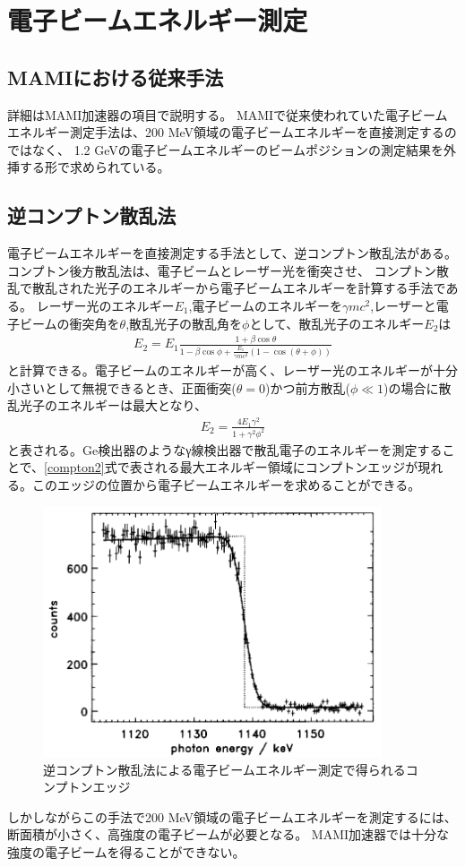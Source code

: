 \documentclass[a4paper,11pt,uplatex]{jsbook}
\begin{document}
\section{電子ビームエネルギー測定}
\subsection{MAMIにおける従来手法}
詳細はMAMI加速器の項目で説明する。%
MAMIで従来使われていた電子ビームエネルギー測定手法は、200 MeV領域の電子ビームエネルギーを直接測定するのではなく、
1.2 GeVの電子ビームエネルギーのビームポジションの測定結果を外挿する形で求められている。
\subsection{逆コンプトン散乱法}
電子ビームエネルギーを直接測定する手法として、逆コンプトン散乱法がある。コンプトン後方散乱法は、電子ビームとレーザー光を衝突させ、
コンプトン散乱で散乱された光子のエネルギーから電子ビームエネルギーを計算する手法である。
レーザー光のエネルギー$E_1$,電子ビームのエネルギーを$\gamma mc^2$,レーザーと電子ビームの衝突角を$\theta$,散乱光子の散乱角を$\phi$として、散乱光子のエネルギー$E_2$は
\begin{eqnarray}
  E_2 = E_1\frac{1+\beta\cos{\theta}}{1-\beta\cos{\phi} + \frac{E_1}{\gamma mc^2} (1-\cos{(\theta +\phi)})} \label{compton}
\end{eqnarray}
と計算できる。電子ビームのエネルギーが高く、レーザー光のエネルギーが十分小さいとして無視できるとき、正面衝突($\theta = 0$)かつ前方散乱($\phi \ll 1$)の場合に散乱光子のエネルギーは最大となり、
\begin{eqnarray}
  E_2 = \frac{4E_1\gamma^2}{1 + \gamma^2\phi^2} \label{compton2}
\end{eqnarray}
と表される。Ge検出器のようなγ線検出器で散乱電子のエネルギーを測定することで、\ref{compton2}式で表される最大エネルギー領域にコンプトンエッジが現れる。このエッジの位置から電子ビームエネルギーを求めることができる。
\begin{figure}
  \centering
  \includegraphics[width=10cm]{image/1-CBS.png}
  \caption[逆コンプトン散乱法]{逆コンプトン散乱法による電子ビームエネルギー測定で得られるコンプトンエッジ\cite{klein1997}}
\end{figure}
しかしながらこの手法で200 MeV領域の電子ビームエネルギーを測定するには、断面積が小さく、高強度の電子ビームが必要となる。%
MAMI加速器では十分な強度の電子ビームを得ることができない。
\end{document}
